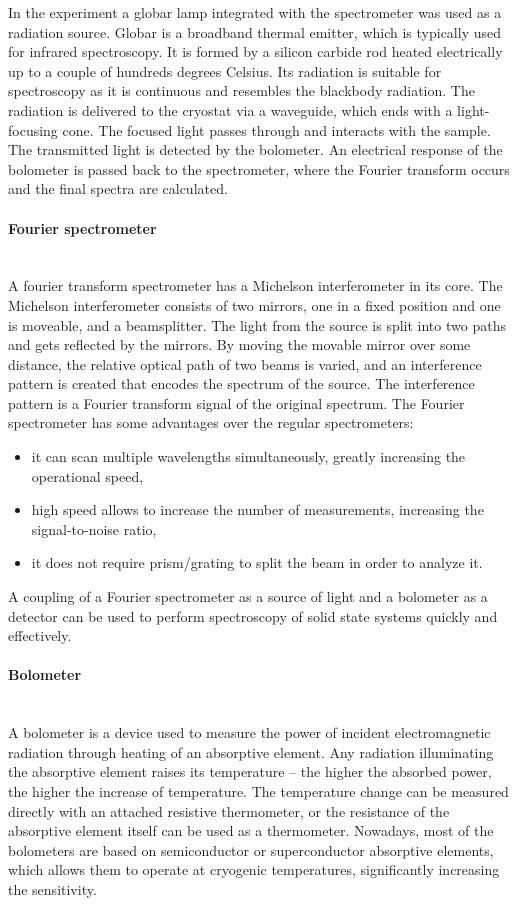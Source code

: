 \documentclass[titlepage,a4paper]{book}
\newcommand{\wciecie}{\quad\phantom{v}}
\newcommand{\myparagraph}[1]{\paragraph{#1}\mbox{}\\}
\begin{document}
In the experiment a globar lamp integrated with the spectrometer was used as a radiation source. Globar is a broadband thermal emitter, which is typically used for infrared spectroscopy. It is formed by a silicon carbide rod heated electrically up to a couple of hundreds degrees Celsius. Its radiation is suitable for spectroscopy as it is continuous and resembles the blackbody radiation. The radiation is delivered to the cryostat via a waveguide, which ends with a light-focusing cone. The focused light passes through and interacts with the sample. The transmitted light is detected by the bolometer. An electrical response of the bolometer is passed back to the spectrometer, where the Fourier transform occurs and the final spectra are calculated.

\myparagraph{Fourier spectrometer}
\wciecie
A fourier transform spectrometer has a Michelson interferometer in its core. The Michelson interferometer consists of two mirrors, one in a fixed position and one is moveable, and a beamsplitter. The light from the source is split into two paths and gets reflected by the mirrors. By moving the movable mirror over some distance, the relative optical path of two beams is varied, and an interference pattern is created that encodes the spectrum of the source. The interference pattern is a Fourier transform signal of the original spectrum. The Fourier spectrometer has some advantages over the regular spectrometers:
\begin{itemize}
\item it can scan multiple wavelengths simultaneously, greatly increasing the operational speed, 
\item high speed allows to increase the number of measurements, increasing the signal-to-noise ratio,
\item it does not require prism/grating to split the beam in order to analyze it.
\end{itemize}

A coupling of a Fourier spectrometer as a source of light and a bolometer as a detector can be used to perform spectroscopy of solid state systems quickly and effectively.

\myparagraph{Bolometer}
\wciecie
A bolometer is a device used to measure the power of incident electromagnetic radiation through heating of an absorptive element. Any radiation illuminating the absorptive element raises its temperature -- the higher the absorbed power, the higher the increase of temperature. The temperature change can be measured directly with an attached resistive thermometer, or the resistance of the absorptive element itself can be used as a thermometer. Nowadays, most of the bolometers are based on semiconductor or superconductor absorptive elements, which allows them to operate at cryogenic temperatures, significantly increasing the sensitivity.
\end{document}
